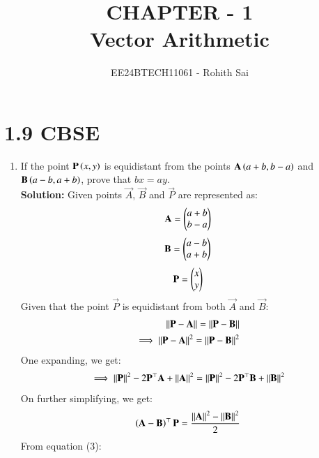 \documentclass[journal]{IEEEtran}
\begin{document}

\vspace{3cm}

\title{CHAPTER - 1\\Vector Arithmetic}
\author{EE24BTECH11061 - Rohith Sai}
\maketitle

\renewcommand{\thefigure}{\theenumi}
\renewcommand{\thetable}{\theenumi}

\section{1.9 CBSE}
\begin{enumerate}
\item If the point $\mathbf{P}\left(x,y\right)$ is equidistant from the points $\mathbf{A}\left(a+b,b-a\right)$ and $\mathbf{B}\left(a-b,a+b\right)$, prove that $bx=ay$.\\
\textbf{Solution:}
Given points $\vec{A}$, $\vec{B}$ and $\vec{P}$ are represented as:
\begin{align}
    \mathbf{A} = \begin{pmatrix}a+b\\b-a\end{pmatrix}
\end{align}
\begin{align}
    \mathbf{B} = \begin{pmatrix}a-b\\a+b\end{pmatrix}
\end{align}
\begin{align}
    \mathbf{P} = \begin{pmatrix}x\\y\end{pmatrix}
\end{align}
Given that the point $\vec{P}$ is equidistant from both $\vec{A}$ and $\vec{B}$:
\begin{align}
    \left\vert\left\vert\mathbf{P}-\mathbf{A}\right\vert\right\vert = \left\vert\left\vert\mathbf{P}-\mathbf{B}\right\vert\right\vert\\
    \implies {\left\vert\left\vert\mathbf{P}-\mathbf{A}\right\vert\right\vert}^2 = {\left\vert\left\vert\mathbf{P}-\mathbf{B}\right\vert\right\vert}^2
\end{align}
One expanding, we get:
\begin{align}
    \implies \left\vert\left\vert\mathbf{P}\right\vert\right\vert^2 - 2\mathbf{P}^\top\mathbf{A} + \left\vert\left\vert\mathbf{A}\right\vert\right\vert^2 = \left\vert\left\vert\mathbf{P}\right\vert\right\vert^2 - 2\mathbf{P}^\top\mathbf{B} + \left\vert\left\vert\mathbf{B}\right\vert\right\vert^2
\end{align}
On further simplifying, we get:
\begin{align}
    \left(\mathbf{A}-\mathbf{B}\right)^\top\mathbf{P} = \frac{\left\vert\left\vert\mathbf{A}\right\vert\right\vert^2 - \left\vert\left\vert\mathbf{B}\right\vert\right\vert^2}{2}\\
\end{align}
From equation (3):
\begin{align}

\end{align}
\end{enumerate}
\end{document}
